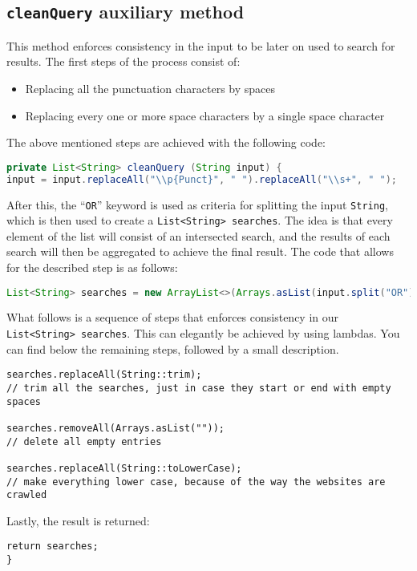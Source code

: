 \subsection{{\tt cleanQuery} auxiliary method}
This method enforces consistency in the input to be later on used to search for results.
The first steps of the process consist of:
\begin{itemize}
    \item Replacing all the punctuation characters by spaces
    \item Replacing every one or more space characters by a single space character
\end{itemize}
The above mentioned steps are achieved with the following code:
\begin{lstlisting}[language=Java]
private List<String> cleanQuery (String input) {
input = input.replaceAll("\\p{Punct}", " ").replaceAll("\\s+", " ");
\end{lstlisting}
After this, the ``{\tt OR}'' keyword is used as criteria for splitting the input {\tt String}, which is then used to create a {\tt List<String> searches}. The idea is that every element of the list will consist of an intersected search, and the results of each search will then be aggregated to achieve the final result. The code that allows for the described step is as follows:
\begin{lstlisting}[language=Java]
List<String> searches = new ArrayList<>(Arrays.asList(input.split("OR")));
\end{lstlisting}
What follows is a sequence of steps that enforces consistency in our {\tt List<String> searches}. This can elegantly be achieved by using lambdas. You can find below the remaining steps, followed by a small description.
\begin{lstlisting}
searches.replaceAll(String::trim);
// trim all the searches, just in case they start or end with empty spaces

searches.removeAll(Arrays.asList(""));
// delete all empty entries

searches.replaceAll(String::toLowerCase);
// make everything lower case, because of the way the websites are crawled
\end{lstlisting}
Lastly, the result is returned:
\begin{lstlisting}
return searches;
}
\end{lstlisting}
